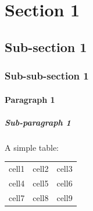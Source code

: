 \documentclass[11pt, letterpaper]{article}
\begin{document}

\section{Section 1}

\subsection{Sub-section 1}

\subsubsection{Sub-sub-section 1}

\paragraph{Paragraph 1}

\subparagraph{Sub-paragraph 1}

\clearpage

A simple table:

\begin{center}
\begin{tabular}{ c c c }
 cell1 & cell2 & cell3 \\ 
 cell4 & cell5 & cell6 \\  
 cell7 & cell8 & cell9    
\end{tabular}
\end{center}
\end{document}
